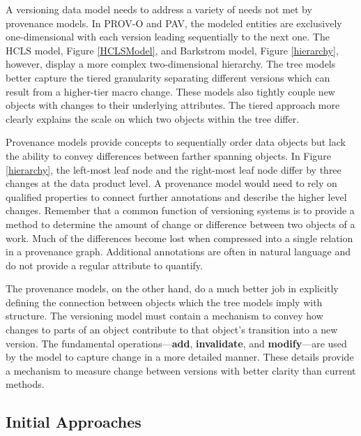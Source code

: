 A versioning data model needs to address a variety of needs not met by provenance models.
In PROV-O and PAV, the modeled entities are exclusively one-dimensional with each version leading sequentially to the next one.
The HCLS model, Figure \ref{HCLSModel}, and Barkstrom model, Figure \ref{hierarchy}, however, display a more complex two-dimensional hierarchy.
The tree models better capture the tiered granularity separating different versions which can result from a higher-tier macro change.
These models also tightly couple new objects with changes to their underlying attributes.
The tiered approach more clearly explains the scale on which two objects within the tree differ.

Provenance models provide concepts to sequentially order data objects but lack the ability to convey differences between farther spanning objects.
In Figure \ref{hierarchy}, the left-most leaf node and the right-most leaf node differ by three changes at the data product level.
A provenance model would need to rely on qualified properties to connect further annotations and describe the higher level changes.
Remember that a common function of versioning systems is to provide a method to determine the amount of change or difference between two objects of a work.
Much of the differences become lost when compressed into a single relation in a provenance graph.
Additional annotations are often in natural language and do not provide a regular attribute to quantify.

The provenance models, on the other hand, do a much better job in explicitly defining the connection between objects which the tree models imply with structure.
The versioning model must contain a mechanism to convey how changes to parts of an object contribute to that object's transition into a new version.
The fundamental operations---\textbf{add}, \textbf{invalidate}, and \textbf{modify}---are used by the model to capture change in a more detailed manner.
These details provide a mechanism to measure change between versions with better clarity than current methods.

\subsection{Initial Approaches}

